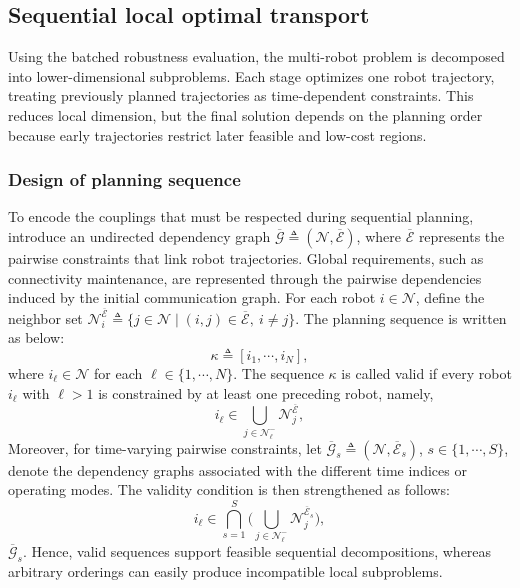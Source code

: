 \subsection{Sequential local optimal transport}
\label{ch06:sec:local}

Using the batched robustness evaluation, the multi-robot problem is decomposed
into lower-dimensional subproblems. Each stage optimizes one robot trajectory,
treating previously planned trajectories as time-dependent constraints. This
reduces local dimension, but the final solution depends on the planning order
because early trajectories restrict later feasible and low-cost regions.

\subsubsection{Design of planning sequence}
\label{ch06:subsec:sequence-design}

To encode the couplings that must be respected during sequential
planning, introduce an undirected dependency graph
$\overline{\mathcal{G}}\triangleq
(\mathcal{N},\overline{\mathcal{E}})$,
where $\overline{\mathcal{E}}$ represents the pairwise constraints that
link robot trajectories.
Global requirements, such as connectivity maintenance, are represented
through the pairwise dependencies induced by the initial communication
graph.
For each robot $i\in\mathcal{N}$, define the neighbor set
$\mathcal{N}_i^{\overline{\mathcal{E}}}\triangleq
\{j\in\mathcal{N}\mid (i,j)\in\overline{\mathcal{E}},\ i\neq j\}$.
The planning sequence is written as below:
\begin{equation}
\label{ch06:eq:order}
\kappa\triangleq [i_1,\cdots,i_N],
\end{equation}
where $i_\ell\in\mathcal{N}$ for each
$\ell\in\{1,\cdots,N\}$.
The sequence $\kappa$ is called valid if every robot $i_\ell$ with
$\ell>1$ is constrained by at least one preceding robot, namely,
\[
i_\ell\in
\bigcup_{j\in\mathcal{N}_\ell^-}\mathcal{N}_j^{\overline{\mathcal{E}}},
\]
Moreover, for time-varying pairwise constraints, let
$\overline{\mathcal{G}}_s\triangleq
(\mathcal{N},\overline{\mathcal{E}}_s)$,
$s\in\{1,\cdots,S\}$, denote the dependency graphs associated with the
different time indices or operating modes.
The validity condition is then strengthened as follows:
\[
i_\ell\in
\bigcap_{s=1}^S
\Big(
\bigcup_{j\in\mathcal{N}_\ell^-}
\mathcal{N}_j^{\overline{\mathcal{E}}_s}
\Big),
\]
$\overline{\mathcal G}_s$.
Hence, valid sequences support feasible sequential decompositions,
whereas arbitrary orderings can easily produce incompatible local
subproblems.

